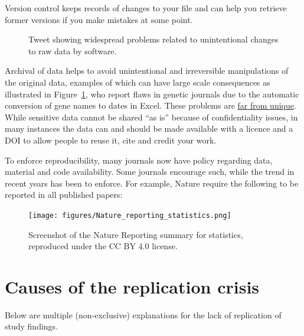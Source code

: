 \documentclass[
  11pt,
  letterpaper,
]{scrbook}
\theoremstyle{definition}
\theoremstyle{definition}
\theoremstyle{remark}
\begin{document}
Version control keeps records of changes to your file and can help you
retrieve former versions if you make mistakes at some point.

\begin{figure}[ht!]


\caption{\label{fig-reprotweetexcelgenes}Tweet showing widespread
problems related to unintentional changes to raw data by software.}

\end{figure}%

Archival of data helps to avoid unintentional and irreversible
manipulations of the original data, examples of which can have large
scale consequences as illustrated in
Figure~\ref{fig-reprotweetexcelgenes}, who report flaws in genetic
journals due to the automatic conversion of gene names to dates in
Excel. These problems are
\href{https://www.theguardian.com/politics/2020/oct/05/how-excel-may-have-caused-loss-of-16000-covid-tests-in-england}{far
from unique}. While sensitive data cannot be shared ``as is'' because of
confidentiality issues, in many instances the data can and should be
made available with a licence and a DOI to allow people to reuse it,
cite and credit your work.

To enforce reproducibility, many journals now have policy regarding
data, material and code availability. Some journals encourage such,
while the trend in recent years has been to enforce. For example, Nature
require the following to be reported in all published papers:

\begin{figure}[ht!]

{\centering \texttt{[image: figures/Nature\_reporting\_statistics.png]}

}

\caption{Screenshot of the Nature Reporting summary for statistics,
reproduced under the CC BY 4.0 license.}

\end{figure}%

\section{Causes of the replication
crisis}\label{causes-of-the-replication-crisis}

Below are multiple (non-exclusive) explanations for the lack of
replication of study findings.
\end{document}
